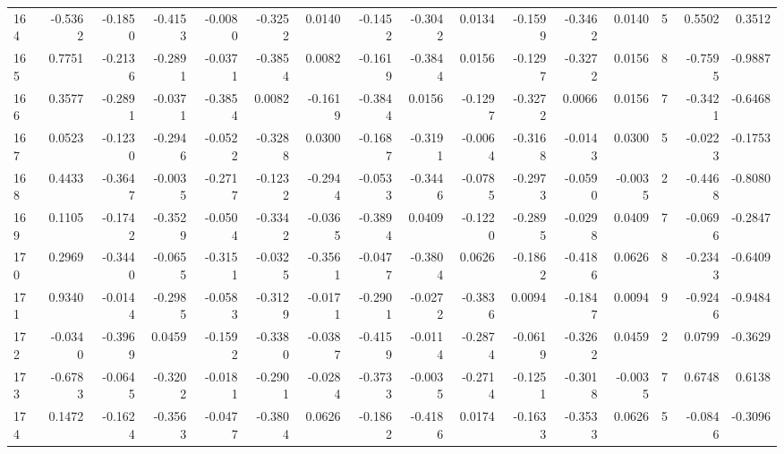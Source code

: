 \begin{tabular}{lrrrrrrrrrrrrrrr}
164 &     -0.5362 & -0.1850 & -0.4153 & -0.0080 & -0.3252 &  0.0140 & -0.1452 & -0.3042 &  0.0134 & -0.1599 &  -0.3462 &     0.0140 &      5 &                    0.5502 &                     0.3512 \\
165 &      0.7751 & -0.2136 & -0.2891 & -0.0371 & -0.3854 &  0.0082 & -0.1619 & -0.3844 &  0.0156 & -0.1297 &  -0.3272 &     0.0156 &      8 &                   -0.7595 &                    -0.9887 \\
166 &      0.3577 & -0.2891 & -0.0371 & -0.3854 &  0.0082 & -0.1619 & -0.3844 &  0.0156 & -0.1297 & -0.3272 &   0.0066 &     0.0156 &      7 &                   -0.3421 &                    -0.6468 \\
167 &      0.0523 & -0.1230 & -0.2946 & -0.0522 & -0.3288 &  0.0300 & -0.1687 & -0.3191 & -0.0064 & -0.3168 &  -0.0143 &     0.0300 &      5 &                   -0.0223 &                    -0.1753 \\
168 &      0.4433 & -0.3647 & -0.0035 & -0.2717 & -0.1232 & -0.2944 & -0.0533 & -0.3446 & -0.0785 & -0.2973 &  -0.0590 &    -0.0035 &      2 &                   -0.4468 &                    -0.8080 \\
169 &      0.1105 & -0.1742 & -0.3529 & -0.0504 & -0.3342 & -0.0365 & -0.3894 &  0.0409 & -0.1220 & -0.2895 &  -0.0298 &     0.0409 &      7 &                   -0.0696 &                    -0.2847 \\
170 &      0.2969 & -0.3440 & -0.0655 & -0.3151 & -0.0325 & -0.3561 & -0.0477 & -0.3804 &  0.0626 & -0.1862 &  -0.4186 &     0.0626 &      8 &                   -0.2343 &                    -0.6409 \\
171 &      0.9340 & -0.0144 & -0.2985 & -0.0583 & -0.3129 & -0.0171 & -0.2901 & -0.0272 & -0.3836 &  0.0094 &  -0.1847 &     0.0094 &      9 &                   -0.9246 &                    -0.9484 \\
172 &     -0.0340 & -0.3969 &  0.0459 & -0.1592 & -0.3380 & -0.0387 & -0.4159 & -0.0114 & -0.2874 & -0.0619 &  -0.3262 &     0.0459 &      2 &                    0.0799 &                    -0.3629 \\
173 &     -0.6783 & -0.0645 & -0.3202 & -0.0181 & -0.2901 & -0.0284 & -0.3733 & -0.0035 & -0.2714 & -0.1251 &  -0.3018 &    -0.0035 &      7 &                    0.6748 &                     0.6138 \\
174 &      0.1472 & -0.1624 & -0.3563 & -0.0477 & -0.3804 &  0.0626 & -0.1862 & -0.4186 &  0.0174 & -0.1633 &  -0.3533 &     0.0626 &      5 &                   -0.0846 &                    -0.3096 \\

\end{tabular}

